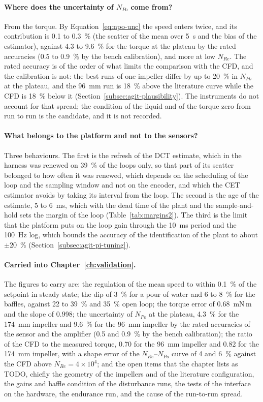 \paragraph{Where does the uncertainty of $N_{Po}$ come from?}
From the torque. By Equation~\ref{eq:npo-unc} the speed enters twice, and its contribution is 0.1 to 0.3~\% (the scatter of the mean over 5~s and the bias of the estimator), against 4.3 to 9.6~\% for the torque at the plateau by the rated accuracies (0.5 to 0.9~\% by the bench calibration), and more at low $N_{Re}$. The rated accuracy is of the order of what limits the comparison with the CFD, and the calibration is not: the best runs of one impeller differ by up to 20~\% in $N_{Po}$ at the plateau, and the 96~mm run is 18~\% above the literature curve while the CFD is 18~\% below it (Section~\ref{subsec:agit-plausibility}). The instruments do not account for that spread; the condition of the liquid and of the torque zero from run to run is the candidate, and it is not recorded.

\paragraph{What belongs to the platform and not to the sensors?}
Three behaviours. The first is the refresh of the DCT estimate, which in the harness was renewed on 39~\% of the loops only, so that part of its scatter belonged to how often it was renewed, which depends on the scheduling of the loop and the sampling window and not on the encoder, and which the CET estimator avoids by taking its interval from the loop. The second is the age of the estimate, 5 to 6~ms, which with the dead time of the plant and the sample-and-hold sets the margin of the loop (Table~\ref{tab:margins2}). The third is the limit that the platform puts on the loop gain through the 10~ms period and the 100~Hz log, which bounds the accuracy of the identification of the plant to about $\pm 20$~\% (Section~\ref{subsec:agit-pi-tuning}).

\paragraph{Carried into Chapter~\ref{ch:validation}.}
The figures to carry are: the regulation of the mean speed to within 0.1~\% of the setpoint in steady state; the dip of 3~\% for a pour of water and 6 to 8~\% for the baffles, against 22 to 39~\% and 35~\% open loop; the torque error of 0.68~mN\,m and the slope of 0.998; the uncertainty of $N_{Po}$ at the plateau, 4.3~\% for the 174~mm impeller and 9.6~\% for the 96~mm impeller by the rated accuracies of the sensor and the amplifier (0.5 and 0.9~\% by the bench calibration); the ratio of the CFD to the measured torque, 0.70 for the 96~mm impeller and 0.82 for the 174~mm impeller, with a shape error of the $N_{Re}$--$N_{Po}$ curve of 4 and 6~\% against the CFD above $N_{Re} = 4\times10^{4}$; and the open items that the chapter lists as TODO, chiefly the geometry of the impellers and of the literature configuration, the gains and baffle condition of the disturbance runs, the tests of the interface on the hardware, the endurance run, and the cause of the run-to-run spread.
